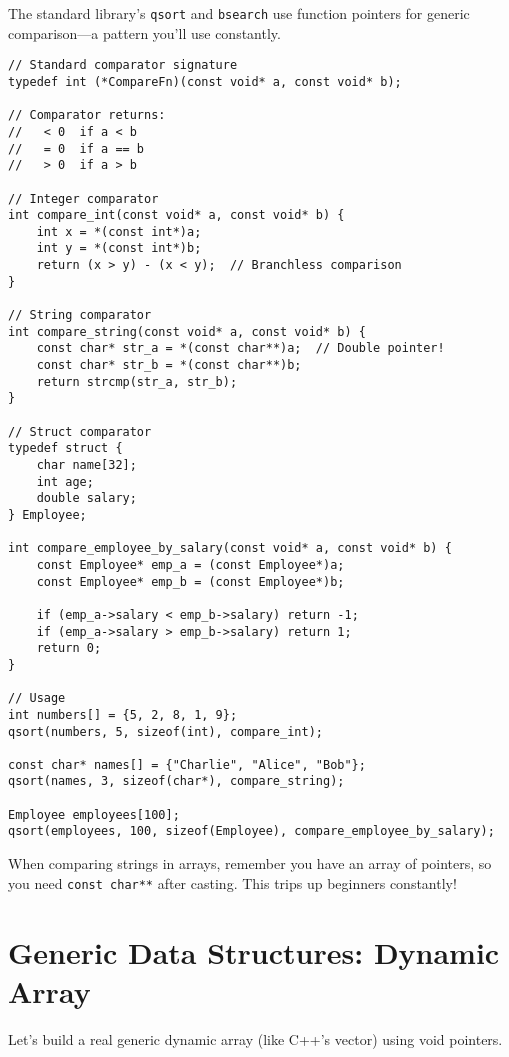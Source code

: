 The standard library's \texttt{qsort} and \texttt{bsearch} use function pointers for generic comparison—a pattern you'll use constantly.

\begin{lstlisting}
// Standard comparator signature
typedef int (*CompareFn)(const void* a, const void* b);

// Comparator returns:
//   < 0  if a < b
//   = 0  if a == b
//   > 0  if a > b

// Integer comparator
int compare_int(const void* a, const void* b) {
    int x = *(const int*)a;
    int y = *(const int*)b;
    return (x > y) - (x < y);  // Branchless comparison
}

// String comparator
int compare_string(const void* a, const void* b) {
    const char* str_a = *(const char**)a;  // Double pointer!
    const char* str_b = *(const char**)b;
    return strcmp(str_a, str_b);
}

// Struct comparator
typedef struct {
    char name[32];
    int age;
    double salary;
} Employee;

int compare_employee_by_salary(const void* a, const void* b) {
    const Employee* emp_a = (const Employee*)a;
    const Employee* emp_b = (const Employee*)b;

    if (emp_a->salary < emp_b->salary) return -1;
    if (emp_a->salary > emp_b->salary) return 1;
    return 0;
}

// Usage
int numbers[] = {5, 2, 8, 1, 9};
qsort(numbers, 5, sizeof(int), compare_int);

const char* names[] = {"Charlie", "Alice", "Bob"};
qsort(names, 3, sizeof(char*), compare_string);

Employee employees[100];
qsort(employees, 100, sizeof(Employee), compare_employee_by_salary);
\end{lstlisting}

\begin{tipbox}
When comparing strings in arrays, remember you have an array of pointers, so you need \texttt{const char**} after casting. This trips up beginners constantly!
\end{tipbox}

\section{Generic Data Structures: Dynamic Array}

Let's build a real generic dynamic array (like C++'s vector) using void pointers.


